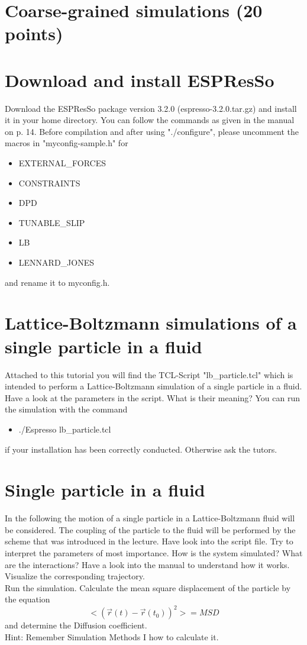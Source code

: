 \documentclass[11pt,a4paper,%
	       headsepline=false, footsepline=false, notitlepage, %
	       bigheadings, %
	       bibtotoc, %
	       final]{scrartcl}
\begin{document}
\section*{Coarse-grained simulations (20 points)}
\section*{Download and install ESPResSo}
Download the ESPResSo package version 3.2.0 (espresso-3.2.0.tar.gz) and install it in your home directory. 
You can follow the commands as given in the manual on p. 14.
Before compilation and after using "./configure", please uncomment the macros in "myconfig-sample.h" for
\begin{itemize}
\item EXTERNAL\_FORCES
\item CONSTRAINTS
\item DPD
\item TUNABLE\_SLIP
\item LB
\item LENNARD\_JONES
\end{itemize}
and rename it to myconfig.h.

\section*{Lattice-Boltzmann simulations of a single particle in a fluid}
Attached to this tutorial you will find the TCL-Script "lb\_particle.tcl" which is intended to perform a Lattice-Boltzmann simulation of a single particle in a fluid. 
Have a look at the parameters in the script. What is their meaning?
You can run the simulation with the command
\begin{itemize}
\item ./Espresso lb\_particle.tcl
\end{itemize}
if your installation has been correctly conducted. Otherwise ask the tutors.
\section{Single particle in a fluid}
In the following the motion of a single particle in a Lattice-Boltzmann fluid will be considered. The coupling of the particle to the fluid will be performed by the scheme that was introduced in the lecture.
Have look into the script file. Try to interpret the parameters of most importance.
How is the system simulated? What are the interactions? Have a look into the manual to understand how it works.
Visualize the corresponding trajectory.\\
Run the simulation.
Calculate the mean square displacement of the particle by the equation
\begin{equation}
<(\vec{r}(t)-\vec{r}(t_0))^2> = MSD
\end{equation}
and determine the Diffusion coefficient. \\
Hint: Remember Simulation Methods I how to calculate it.
\end{document}
